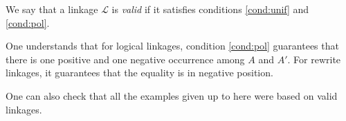 
\begin{definition}
  We say that a linkage $\mathcal{L}$ is \emph{valid} if it satisfies conditions
  \ref{cond:unif} and \ref{cond:pol}.
\end{definition}

One understands that for logical linkages, condition \ref{cond:pol} guarantees
that there is one positive and one negative occurrence among $A$ and $A'$. For
rewrite linkages, it guarantees that the equality is in negative position.

One can also check that all the examples given up to here were based on valid
linkages.




